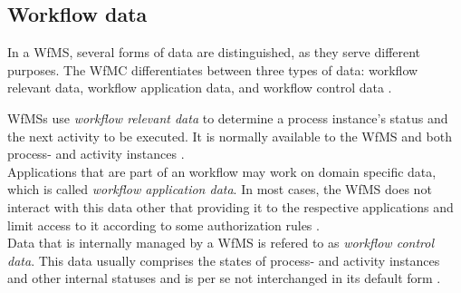   \subsection{Workflow data} %
  \label{sub:workflow_data}
    In a \ac{WfMS}, several forms of data are distinguished, as they serve different purposes. The \ac{WfMC} differentiates between three types of data: workflow relevant data, workflow application data, and workflow control data \cite{Hollingsworth1995Wfmc}.

    \acp{WfMS} use \emph{workflow relevant data} to determine a process instance's status and the next activity to be executed. It is normally available to the \ac{WfMS} and both process- and activity instances \cite{Hollingsworth1995Wfmc}. \\
    Applications that are part of an workflow may work on domain specific data, which is called \emph{workflow application data}. In most cases, the \ac{WfMS} does not interact with this data other that providing it to the respective applications and limit access to it according to some authorization rules \cite{Hollingsworth1995Wfmc,Casati1999Specification}. \\
    Data that is internally managed by a \ac{WfMS} is refered to as \emph{workflow control data}. This data usually comprises the states of process- and activity instances and other internal statuses and is per se not interchanged in its default form \cite{Hollingsworth1995Wfmc,Casati1999Specification}.

